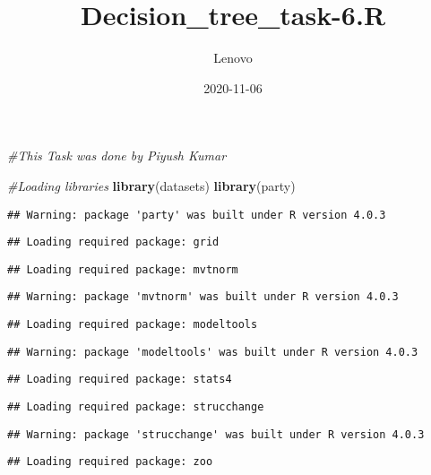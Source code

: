 \documentclass[
]{article}
\title{Decision\_tree\_task-6.R}
\author{Lenovo}
\date{2020-11-06}
\newenvironment{Shaded}{\begin{snugshade}}{\end{snugshade}}
\newcommand{\CommentTok}[1]{\textcolor[rgb]{0.56,0.35,0.01}{\textit{#1}}}
\newcommand{\KeywordTok}[1]{\textcolor[rgb]{0.13,0.29,0.53}{\textbf{#1}}}
\newcommand{\NormalTok}[1]{#1}
\begin{document}
\maketitle

\begin{Shaded}
\begin{Highlighting}[]
\CommentTok{#This Task was done by Piyush Kumar}

\CommentTok{#Loading libraries}
\KeywordTok{library}\NormalTok{(datasets)}
\KeywordTok{library}\NormalTok{(party)}
\end{Highlighting}
\end{Shaded}

\begin{verbatim}
## Warning: package 'party' was built under R version 4.0.3
\end{verbatim}

\begin{verbatim}
## Loading required package: grid
\end{verbatim}

\begin{verbatim}
## Loading required package: mvtnorm
\end{verbatim}

\begin{verbatim}
## Warning: package 'mvtnorm' was built under R version 4.0.3
\end{verbatim}

\begin{verbatim}
## Loading required package: modeltools
\end{verbatim}

\begin{verbatim}
## Warning: package 'modeltools' was built under R version 4.0.3
\end{verbatim}

\begin{verbatim}
## Loading required package: stats4
\end{verbatim}

\begin{verbatim}
## Loading required package: strucchange
\end{verbatim}

\begin{verbatim}
## Warning: package 'strucchange' was built under R version 4.0.3
\end{verbatim}

\begin{verbatim}
## Loading required package: zoo
\end{verbatim}
\end{document}
